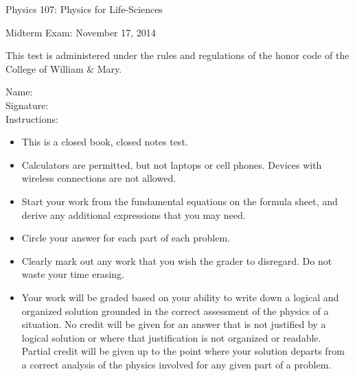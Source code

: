 \documentclass[letterpaper,addpoints,answers]{exam}
\begin{document}
\begin{coverpages}
 \large\bfseries
 
 \noindent 
 Physics 107: Physics for Life-Sciences

 \vspace{2ex}
 \noindent
 Midterm Exam: November 17, 2014

 \vspace{3ex}
 \noindent 
 This test is administered under the rules and regulations of the honor code of the College of William \& Mary.

 \vspace{2ex}
 \noindent 
 Name:\enspace\makebox[2.3in]{\hrulefill} \\

 \noindent 
 Signature:\enspace\makebox[2in]{\hrulefill} \\

 \vspace{5ex}
 \noindent 
 Instructions:
 \begin{itemize}
  \item This is a closed book, closed notes test.
  \item Calculators are permitted, but not laptops or cell phones. Devices with wireless connections are not allowed.
  \item Start your work from the fundamental equations on the formula sheet, and derive any additional expressions that you may need.
  \item Circle your answer for each part of each problem. 
  \item Clearly mark out any work that you wish the grader to disregard.  Do not waste your time erasing.
  \item Your work will be graded based on your ability to write down a logical and organized solution grounded in the correct assessment of the physics of a situation. No credit will be given for an answer that is not justified by a logical solution or where that justification is not organized or readable. Partial credit will be given up to the point where your solution departs from a correct analysis of the physics involved for any given part of a problem.
 \end{itemize}

 \pagebreak

 \begin{center}
  \gradetable[v][questions]
 \end{center}
 
\end{coverpages}
 
\end{document}
